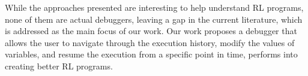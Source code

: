 While the approaches presented are interesting to help understand \ac{RL} programs, none of them 
are actual debuggers, leaving a gap in the current literature, which is addressed as the main focus of 
our work. Our work proposes a debugger that allows the user to navigate through the execution 
history, modify the values of variables, and resume the execution from a specific point in time, 
performs into creating better \ac{RL} programs.


\endinput

